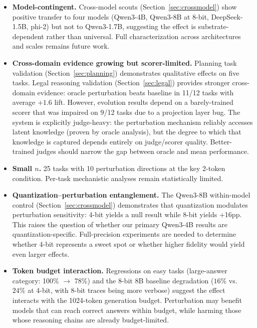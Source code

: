 \documentclass{article}
\begin{document}
\begin{itemize}
    \item \textbf{Model-contingent.} Cross-model scouts
    (Section~\ref{sec:crossmodel}) show positive transfer to four models
    (Qwen3-4B, Qwen3-8B at 8-bit, DeepSeek-1.5B, phi-2) but not to
    Qwen3-1.7B, suggesting the effect is substrate-dependent rather than
    universal. Full characterization across architectures and scales
    remains future work.

    \item \textbf{Cross-domain evidence growing but scorer-limited.}
    Planning task validation (Section~\ref{sec:planning}) demonstrates
    qualitative effects on five tasks. Legal reasoning validation
    (Section~\ref{sec:legal}) provides stronger cross-domain evidence:
    oracle perturbation beats baseline in 11/12 tasks with average
    $+1.6$ lift. However, evolution results depend on a barely-trained
    scorer that was impaired on 9/12 tasks due to a projection layer bug.
    The system is explicitly judge-heavy: the perturbation mechanism
    reliably accesses latent knowledge (proven by oracle analysis), but
    the degree to which that knowledge is captured depends entirely on
    judge/scorer quality. Better-trained judges should narrow the gap
    between oracle and mean performance.

    \item \textbf{Small $n$.} 25 tasks with 10 perturbation directions at
    the key 2-token condition. Per-task mechanistic analyses remain
    statistically limited.

    \item \textbf{Quantization--perturbation entanglement.}
    The Qwen3-8B within-model control (Section~\ref{sec:crossmodel})
    demonstrates that quantization modulates perturbation sensitivity:
    4-bit yields a null result while 8-bit yields +16pp.
    This raises the question of whether our primary Qwen3-4B results
    are quantization-specific. Full-precision experiments are needed
    to determine whether 4-bit represents a sweet spot or whether
    higher fidelity would yield even larger effects.

    \item \textbf{Token budget interaction.} Regressions on easy tasks
    (large-answer category: 100\% $\to$ 78\%) and the 8-bit 8B baseline
    degradation ($16\%$ vs.\ $24\%$ at 4-bit, with 8-bit traces being
    more verbose) suggest the effect interacts with the 1024-token
    generation budget. Perturbation may benefit models that can reach
    correct answers within budget, while harming those whose reasoning
    chains are already budget-limited.


\end{itemize}
\end{document}
